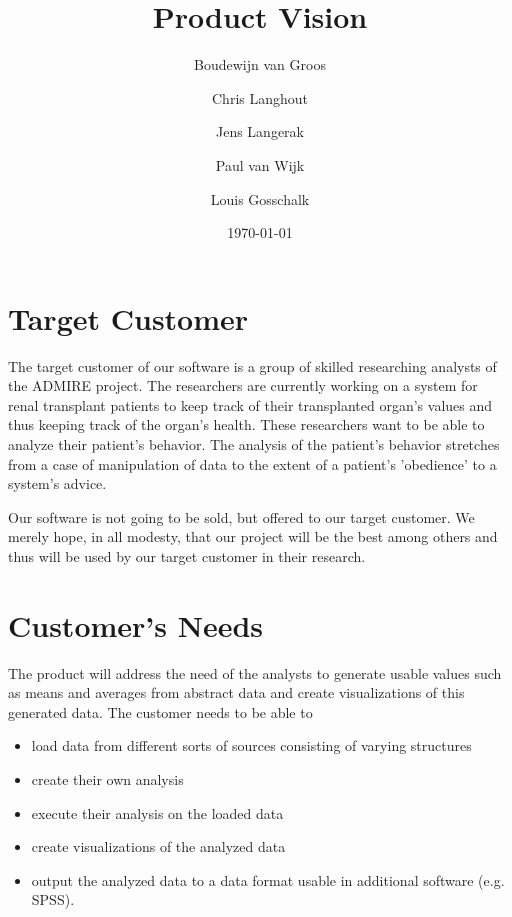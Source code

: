 \documentclass[a4paper]{article}
\title{Product Vision}
\author[1]{Boudewijn van Groos}
\author[2]{Chris Langhout}
\author[3]{Jens Langerak}
\author[4]{Paul van Wijk}
\author[5]{Louis Gosschalk}
\affil[1]{bvangroos \\
4229843}
\affil[2]{clanghout \\
4281705}
\affil[3]{jlangerak \\
4317327}
\affil[4]{pvanwijk \\
4285034}
\affil[5]{lgosschalk \\
4214528}
\date{\today}
\begin{document}
\maketitle
\tableofcontents
\newpage

\section{Target Customer}
The target customer of our software is a group of skilled researching analysts of the ADMIRE project. The researchers are currently working on a system for renal transplant patients to keep track of their transplanted organ's values and thus keeping track of the organ's health. These researchers want to be able to analyze their patient's behavior. The analysis of the patient's behavior stretches from a case of manipulation of data to the extent of a patient's 'obedience' to a system's advice. 
\par
Our software is not going to be sold, but offered to our target customer. We merely hope, in all modesty, that our project will be the best among others and thus will be used by our target customer in their research.

\section{Customer's Needs}
The product will address the need of the analysts to generate usable values such as means and averages from abstract data and create visualizations of this generated data. The customer needs to be able to 
\begin{itemize}
\item load data from different sorts of sources consisting of varying structures 
\item create their own analysis 
\item execute their analysis on the loaded data
\item create visualizations of the analyzed data
\item output the analyzed data to a data format usable in additional software (e.g. SPSS).
\end{itemize}
\end{document}
